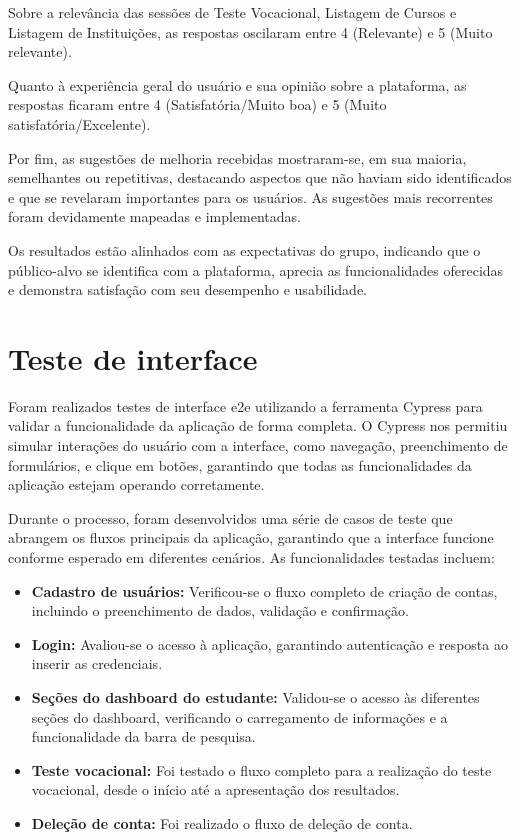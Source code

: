 Sobre a relevância das sessões de Teste Vocacional, Listagem de Cursos e Listagem de Instituições, as respostas oscilaram entre 4 (Relevante) e 5 (Muito relevante).

Quanto à experiência geral do usuário e sua opinião sobre a plataforma, as respostas ficaram entre 4 (Satisfatória/Muito boa) e 5 (Muito satisfatória/Excelente).

Por fim, as sugestões de melhoria recebidas mostraram-se, em sua maioria, semelhantes ou repetitivas, destacando aspectos que não haviam sido identificados e que se revelaram importantes para os usuários. As sugestões mais recorrentes foram devidamente mapeadas e implementadas.

Os resultados estão alinhados com as expectativas do grupo, indicando que o público-alvo se identifica com a plataforma, aprecia as funcionalidades oferecidas e demonstra satisfação com seu desempenho e usabilidade.

\section{Teste de interface}
Foram realizados testes de interface \ac{e2e} utilizando a ferramenta Cypress para validar a funcionalidade da aplicação de forma completa. O Cypress nos permitiu simular interações do usuário com a interface, como navegação, preenchimento de formulários, e clique em botões, garantindo que todas as funcionalidades da aplicação estejam operando corretamente.

Durante o processo, foram desenvolvidos uma série de casos de teste que abrangem os fluxos principais da aplicação, garantindo que a interface funcione conforme esperado em diferentes cenários. As funcionalidades testadas incluem:

\begin{itemize}
    \item \textbf{Cadastro de usuários:} Verificou-se o fluxo completo de criação de contas, incluindo o preenchimento de dados, validação e confirmação.  
    \item \textbf{Login:} Avaliou-se o acesso à aplicação, garantindo autenticação e resposta ao inserir as credenciais.  
    \item \textbf{Seções do dashboard do estudante:} Validou-se o acesso às diferentes seções do dashboard, verificando o carregamento de informações e a funcionalidade da barra de pesquisa.  
    \item \textbf{Teste vocacional:} Foi testado o fluxo completo para a realização do teste vocacional, desde o início até a apresentação dos resultados.  
    \item \textbf{Deleção de conta:} Foi realizado o fluxo de deleção de conta.
\end{itemize}


